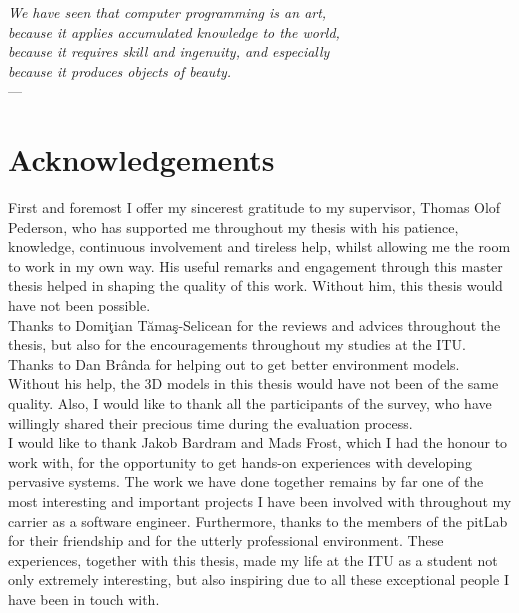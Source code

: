 
\begin{flushright}{\slshape    
    We have seen that computer programming is an art, \\ 
    because it applies accumulated knowledge to the world, \\ 
    because it requires skill and ingenuity, and especially \\
    because it produces objects of beauty.} \\ \medskip
    ---  \citep{knuth:1974}
\end{flushright}


\bigskip

\begingroup
\let\clearpage\relax
\let\cleardoublepage\relax
\let\cleardoublepage\relax
\chapter*{Acknowledgements}
First and foremost I offer my sincerest gratitude to my supervisor, Thomas Olof Pederson, who has supported me throughout my thesis with his patience, knowledge, continuous involvement and tireless help, whilst allowing me the room to work in my own way. His useful remarks and engagement through this master thesis helped in shaping the quality of this work. Without him, this thesis would have not been possible.\\

Thanks to Domi\c tian T\u ama\c s-Selicean for the reviews and advices throughout the thesis, but also for the encouragements throughout my studies at the ITU. Thanks to Dan Br\^{a}nda for helping out to get better environment models. Without his help, the 3D models in this thesis would have not been of the same quality. Also, I would like to thank all the participants of the survey, who have willingly shared their precious time during the evaluation process.\\

I would like to thank Jakob Bardram and Mads Frost, which I had the honour to work with, for the opportunity to get hands-on experiences with developing pervasive systems. The work we have done together remains by far one of the most interesting and important projects I have been involved with throughout my carrier as a software engineer. Furthermore, thanks to the members of the pitLab for their friendship and for the utterly professional environment. These experiences, together with this thesis, made my life at the ITU as a student not only extremely interesting, but also inspiring due to all these exceptional people I have been in touch with.\\

